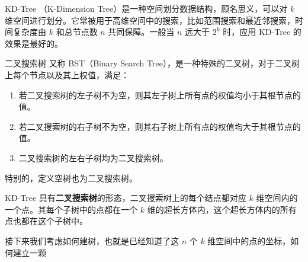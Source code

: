 
KD-Tree （K-Dimension Tree）是一种空间划分数据结构，顾名思义，可以对 $k$ 维空间进行划分。它常被用于高维空间中的搜索，比如范围搜索和最近邻搜索，时间复杂度由 $k$ 和总节点数 $n$ 共同保障。一般当 $n$ 远大于 $2^k$ 时，应用 KD-Tree 的效果是最好的。

\begin{definition}{二叉搜索树}
又称 BST（Binary Search Tree），是一种特殊的二叉树，对于二叉树上每个节点以及其上权值，满足：
\begin{enumerate}
\item 若二叉搜索树的左子树不为空，则其左子树上所有点的权值均小于其根节点的值。
\item 若二叉搜索树的右子树不为空，则其右子树上所有点的权值均大于其根节点的值。
\item 二叉搜索树的左右子树均为二叉搜索树。
\end{enumerate}
特别的，定义空树也为二叉搜索树。
\end{definition}

KD-Tree 具有\textbf{二叉搜索树}的形态，二叉搜索树上的每个结点都对应 $k$ 维空间内的一个点。其每个子树中的点都在一个 $k$ 维的超长方体内，这个超长方体内的所有点也都在这个子树中。

接下来我们考虑如何建树，也就是已经知道了这 $n$ 个 $k$ 维空间中的点的坐标，如何建立一颗